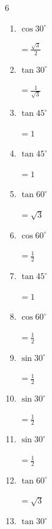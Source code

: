 \begin{multicols}{6}
\begin{enumerate}
        $\displaystyle =\sqrt{3}$

  \item $\displaystyle \cos{30^\circ}$

        $\displaystyle =\frac{\sqrt{3}}{2}$

  \item $\displaystyle \tan{30^\circ}$

        $\displaystyle =\frac{1}{\sqrt{3}}$

  \item $\displaystyle \tan{45^\circ}$

        $\displaystyle =1$

  \item $\displaystyle \tan{45^\circ}$

        $\displaystyle =1$

\columnbreak %

\resetques

  \item $\displaystyle \tan{60^\circ}$

        $\displaystyle =\sqrt{3}$

  \item $\displaystyle \cos{60^\circ}$

        $\displaystyle =\frac{1}{2}$

  \item $\displaystyle \tan{45^\circ}$

        $\displaystyle =1$

  \item $\displaystyle \cos{60^\circ}$

        $\displaystyle =\frac{1}{2}$

  \item $\displaystyle \sin{30^\circ}$

        $\displaystyle =\frac{1}{2}$

  \item $\displaystyle \sin{30^\circ}$

        $\displaystyle =\frac{1}{2}$

  \item $\displaystyle \sin{30^\circ}$

        $\displaystyle =\frac{1}{2}$

  \item $\displaystyle \tan{60^\circ}$

        $\displaystyle =\sqrt{3}$

  \item $\displaystyle \tan{30^\circ}$


\end{enumerate}
\end{multicols}
